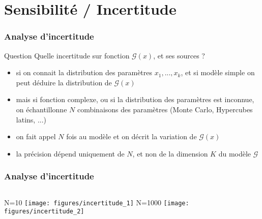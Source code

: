 \documentclass[10pt]{beamer}
\begin{document}
\section{Sensibilité / Incertitude}

\begin{frame}
\frametitle{Analyse d'incertitude}

\begin{block}{Question}
	Quelle incertitude sur fonction $ \mathcal{G} (x) $, et ses sources ?
\end{block}

\begin{itemize}
	\item si on connait la distribution des paramètres $ x_{1},...,x_{k} $, et si modèle simple on peut déduire la distribution de $ \mathcal{G} (x) $
	\item mais si fonction complexe, ou si la distribution des paramètres est inconnue, on échantillonne $ N $ combinaisons des paramètres (Monte Carlo, Hypercubes latins, ...)
	\item on fait appel $ N $ fois au modèle et on décrit la variation de $ \mathcal{G} (x) $
	\item la précision dépend uniquement de $ N $, et non de la dimension $ K $ du modèle $ \mathcal{G} $
\end{itemize}


\end{frame}

\begin{frame}
\frametitle{Analyse d'incertitude}
\bigskip
\bigskip
\begin{columns}
		N=10
		\texttt{[image: figures/incertitude\_1]}
		N=1000
		\texttt{[image: figures/incertitude\_2]}
\end{columns}


\end{frame}
\end{document}
